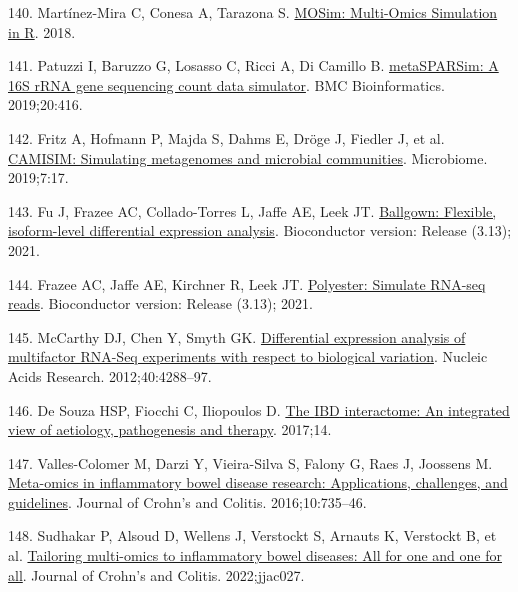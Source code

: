 \documentclass[
  12pt,
  a4paper,
  twoside,
  openright]{book}
\newlength{\cslhangindent}
\newlength{\cslentryspacingunit} %
\newenvironment{CSLReferences}[2] %
 {%
  \setlength{\parindent}{0pt}
  \ifodd #1
  \let\oldpar\par
  \def\par{\hangindent=\cslhangindent\oldpar}
  \fi
  \setlength{\parskip}{#2\cslentryspacingunit}
 }%
 {}
\begin{document}
\begin{CSLReferences}{0}{0}
\leavevmode{}%
140. Martínez-Mira C, Conesa A, Tarazona S. \href{https://doi.org/10.1101/421834}{MOSim: Multi-Omics Simulation in R}. 2018.

\leavevmode{}%
141. Patuzzi I, Baruzzo G, Losasso C, Ricci A, Di Camillo B. \href{https://doi.org/10.1186/s12859-019-2882-6}{metaSPARSim: A 16S rRNA gene sequencing count data simulator}. BMC Bioinformatics. 2019;20:416.

\leavevmode{}%
142. Fritz A, Hofmann P, Majda S, Dahms E, Dröge J, Fiedler J, et al. \href{https://doi.org/10.1186/s40168-019-0633-6}{CAMISIM: Simulating metagenomes and microbial communities}. Microbiome. 2019;7:17.

\leavevmode{}%
143. Fu J, Frazee AC, Collado-Torres L, Jaffe AE, Leek JT. \href{https://doi.org/10.18129/B9.bioc.ballgown}{Ballgown: Flexible, isoform-level differential expression analysis}. Bioconductor version: Release (3.13); 2021.

\leavevmode{}%
144. Frazee AC, Jaffe AE, Kirchner R, Leek JT. \href{https://doi.org/10.18129/B9.bioc.polyester}{Polyester: Simulate RNA-seq reads}. Bioconductor version: Release (3.13); 2021.

\leavevmode{}%
145. McCarthy DJ, Chen Y, Smyth GK. \href{https://doi.org/10.1093/nar/gks042}{Differential expression analysis of multifactor RNA-Seq experiments with respect to biological variation}. Nucleic Acids Research. 2012;40:4288--97.

\leavevmode{}%
146. De Souza HSP, Fiocchi C, Iliopoulos D. \href{https://doi.org/10.1038/nrgastro.2017.110}{The {IBD} interactome: {An} integrated view of aetiology, pathogenesis and therapy}. 2017;14.

\leavevmode{}%
147. Valles-Colomer M, Darzi Y, Vieira-Silva S, Falony G, Raes J, Joossens M. \href{https://doi.org/10.1093/ecco-jcc/jjw024}{Meta-omics in inflammatory bowel disease research: Applications, challenges, and guidelines}. Journal of Crohn's and Colitis. 2016;10:735--46.

\leavevmode{}%
148. Sudhakar P, Alsoud D, Wellens J, Verstockt S, Arnauts K, Verstockt B, et al. \href{https://doi.org/10.1093/ecco-jcc/jjac027}{Tailoring multi-omics to inflammatory bowel diseases: All for one and one for all}. Journal of Crohn's and Colitis. 2022;jjac027.


\end{CSLReferences}
\end{document}
